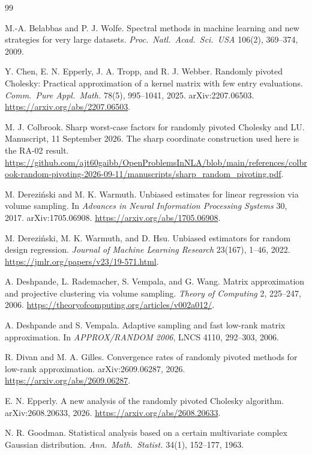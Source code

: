 \documentclass[11pt,a4paper]{article}
\theoremstyle{definition}
\begin{document}
\begin{thebibliography}{99}

M.-A. Belabbas and P. J. Wolfe.
Spectral methods in machine learning and new strategies for very large datasets.
\emph{Proc.\ Natl.\ Acad.\ Sci.\ USA} 106(2), 369--374, 2009.

Y. Chen, E. N. Epperly, J. A. Tropp, and R. J. Webber.
Randomly pivoted Cholesky: Practical approximation of a kernel matrix with few entry evaluations.
\emph{Comm.\ Pure Appl.\ Math.} 78(5), 995--1041, 2025. arXiv:2207.06503.
\url{https://arxiv.org/abs/2207.06503}.

M. J. Colbrook.
Sharp worst-case factors for randomly pivoted Cholesky and LU.
Manuscript, 11 September 2026. The sharp coordinate construction used here is the RA-02 result.
\url{https://github.com/ajt60gaibb/OpenProblemsInNLA/blob/main/references/colbrook-random-pivoting-2026-09-11/manuscripts/sharp_random_pivoting.pdf}.

M. Derezi\'nski and M. K. Warmuth.
Unbiased estimates for linear regression via volume sampling.
In \emph{Advances in Neural Information Processing Systems} 30, 2017. arXiv:1705.06908.
\url{https://arxiv.org/abs/1705.06908}.

M. Derezi\'nski, M. K. Warmuth, and D. Hsu.
Unbiased estimators for random design regression.
\emph{Journal of Machine Learning Research} 23(167), 1--46, 2022.
\url{https://jmlr.org/papers/v23/19-571.html}.

A. Deshpande, L. Rademacher, S. Vempala, and G. Wang.
Matrix approximation and projective clustering via volume sampling.
\emph{Theory of Computing} 2, 225--247, 2006.
\url{https://theoryofcomputing.org/articles/v002a012/}.

A. Deshpande and S. Vempala.
Adaptive sampling and fast low-rank matrix approximation.
In \emph{APPROX/RANDOM 2006}, LNCS 4110, 292--303, 2006.

R. Divan and M. A. Gilles.
Convergence rates of randomly pivoted methods for low-rank approximation.
arXiv:2609.06287, 2026.
\url{https://arxiv.org/abs/2609.06287}.

E. N. Epperly.
A new analysis of the randomly pivoted Cholesky algorithm.
arXiv:2608.20633, 2026.
\url{https://arxiv.org/abs/2608.20633}.

N. R. Goodman.
Statistical analysis based on a certain multivariate complex Gaussian distribution.
\emph{Ann.\ Math.\ Statist.} 34(1), 152--177, 1963.


\end{thebibliography}
\end{document}
